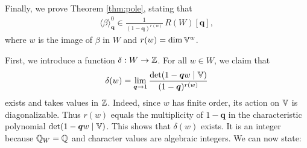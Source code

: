 \documentclass[a4paper,10pt,leqno]{amsart}
\theoremstyle{plain}
\theoremstyle{plain}
\theoremstyle{plain}
\theoremstyle{definition}
\theoremstyle{remark}
\newcommand{\dfemph}[1]{\textbf{#1}}
\newcommand{\Q}{\bm{q}}
\newcommand{\Tr}[1]{\langle{#1}\rangle_{\Q}}
\begin{document}
\subsection{}

Finally, we prove Theorem \ref{thm:pole}, stating that
\begin{align}
\Tr{\beta}^0 \in \frac{1}{(1 - \Q)^{r(w)}}\, R(W)[\Q],
\end{align}
where $w$ is the image of $\beta$ in $W$ and $r(w) = \dim \mathbb{V}^w$.

First, we introduce a function $\delta : W \to \mathbb{Z}$.
For all $w \in W$, we claim that
\begin{align}
\delta(w) = \lim_{\Q \to 1} 
\frac{\det(1 - \Q w \mid \bb{V})}{(1 - \Q)^{r(w)}}
\end{align}
exists and takes values in $\mathbb{Z}$.
Indeed, since $w$ has finite order, its action on $\mathbb{V}$ is diagonalizable.
Thus $r(w)$ equals the multiplicity of $1 - \Q$ in the characteristic polynomial $\det(1 - \Q w \mid \bb{V})$.
This shows that $\delta(w)$ exists.
It is an integer because $\mathbb{Q}_W = \mathbb{Q}$ and character values are algebraic integers.
We can now state:

\end{document}
